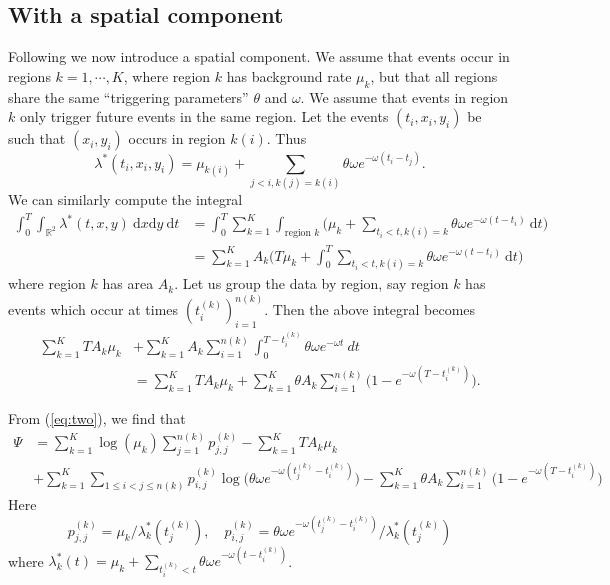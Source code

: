 \documentclass[twoside,a4paper]{article}
\theoremstyle{plain}
\theoremstyle{definition}
\newcommand{\rd}{\textrm{d}}
\begin{document}
\subsection{With a spatial component}\label{app:grid_model_em}

Following \cite[Section~2.2]{sepp2} we now introduce a spatial component.
We assume that events occur in regions $k=1,\cdots,K$, where region $k$ has background rate
$\mu_k$, but that all regions share the same ``triggering parameters'' $\theta$ and $\omega$.
We assume that events in region $k$ only trigger future events in the same region.
Let the events $(t_i, x_i, y_i)$ be such that $(x_i,y_i)$ occurs in region $k(i)$.  Thus
\[ \lambda^*(t_i,x_i,y_i) = \mu_{k(i)} + \sum_{j<i, k(j)=k(i)} \theta \omega e^{-\omega(t_i-t_j)}. \]
We can similarly compute the integral
\begin{align*}
\int_0^T \int_{\mathbb R^2} \lambda^*(t,x,y) \ \rd x \rd y \ \rd t
&= \int_0^T \sum_{k=1}^K \int_{\text{region }k} \Big( \mu_k + \sum_{t_i < t, k(i)=k}
   \theta \omega e^{-\omega(t-t_i)} \ \rd t \Big) \\
&= \sum_{k=1}^K A_k \Big( T\mu_k + \int_0^T \sum_{t_i < t, k(i)=k}
   \theta \omega e^{-\omega(t-t_i)} \ \rd t \Big)
\end{align*}
where region $k$ has area $A_k$.  Let us group the data by region, say
region $k$ has events which occur at times $(t^{(k)}_i)_{i=1}^{n(k)}$.  Then the
above integral becomes
\begin{align*} \sum_{k=1}^K TA_k\mu_k &+ \sum_{k=1}^K A_k \sum_{i=1}^{n(k)}
\int_0^{T-t^{(k)}_i} \theta\omega e^{-\omega t} \ dt \\
&= \sum_{k=1}^K TA_k\mu_k + \sum_{k=1}^K \theta A_k \sum_{i=1}^{n(k)}
\big( 1 - e^{-\omega (T-t^{(k)}_i)} \big).
\end{align*}

From (\ref{eq:two}), we find that
\begin{align*} \Psi &=
\sum_{k=1}^K \log(\mu_k) \sum_{j=1}^{n(k)} p^{(k)}_{j,j} - \sum_{k=1}^K TA_k\mu_k\\
&+ \sum_{k=1}^K \sum_{1\leq i<j\leq n(k)} p^{(k)}_{i,j} \log\big( \theta\omega
  e^{-\omega(t^{(k)}_j - t^{(k)}_i)} \big) - \sum_{k=1}^K \theta A_k \sum_{i=1}^{n(k)}
\big( 1 - e^{-\omega (T-t^{(k)}_i)} \big)
\end{align*}
Here
\[ p^{(k)}_{j,j} = \mu_k / \lambda^*_k(t^{(k)}_j), \quad
p^{(k)}_{i,j} = \theta\omega e^{-\omega(t^{(k)}_j - t^{(k)}_i)} / \lambda^*_k(t^{(k)}_j)
\]
where $\lambda^*_k(t) = \mu_k + \sum_{t^{(k)}_i<t} \theta\omega e^{-\omega(t-t^{(k)}_i)}$.
\end{document}
